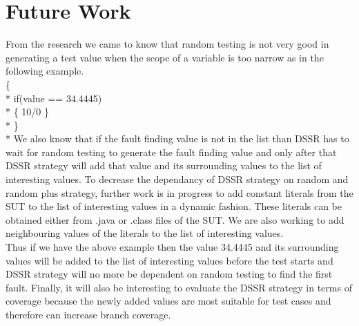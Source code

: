 \documentclass[conference]{IEEEtran}
\begin{document}
\section{Future Work}
From the research we came to know that random testing is not very good in generating a test value when the scope of a variable is too narrow as in the following example.  \\
\begingroup
    \fontsize{7pt}{10pt}\selectfont
\noindent
\{ \\*   
\indent if(value == 34.4445) \\*
\indent \{ 10/0 \} \\* 
\} \\*
\endgroup
\indent We also know that if the fault finding value is not in the list than DSSR has to wait for random testing to generate the fault finding value and only after that DSSR strategy will add that value and its surrounding values to the list of interesting values. To decrease the dependancy of DSSR strategy on random and random plus strategy, further work is in progress to add constant literals from the SUT to the list of interesting values in a dynamic fashion. These literals can be obtained either from .java or .class files of the SUT. We are also working to add  neighbouring values of the literals to the list of interesting values. \\
\indent Thus if we have the above example then the value 34.4445 and its surrounding values will be added to the list of interesting values before the test starts and DSSR strategy will no more be dependent on random testing to find the first fault. Finally, it will also be interesting to evaluate the DSSR strategy in terms of coverage because the newly added values are most suitable for test cases and therefore can increase branch coverage. 



\end{document}
